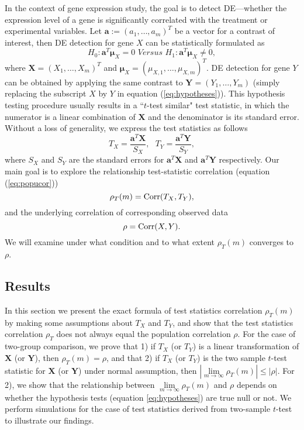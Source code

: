 In the context of gene expression study, the goal is to detect DE---whether the expression 
level of a gene is significantly correlated with the treatment or experimental variables. Let 
$\bm a:=(a_1, \ldots, a_m)^T$ be a vector for a contrast of interest, then DE detection for 
gene $X$ can be statistically formulated as 
\begin{equation}\label{eq:hypotheses}
H_{0}:  \bm a^T\bm \mu_X = 0 \textit{     Versus   }  H_{1}: \bm a^T\bm \mu_X \neq 0,
\end{equation}
where $\bm X = (X_1, \ldots, X_m)^T$ and $\bm \mu_{X} = (\mu_{X, 1}, \ldots, \mu_{X, m})^T$.  
DE detection for gene $Y$ can be obtained by applying the same contrast to $\bm Y = (Y_1, 
\ldots, Y_m)$ (simply replacing the subscript $X$ by $Y$ in equation (\ref{eq:hypotheses})).
This hypothesis testing procedure usually results in a ``$t$-test similar" test statistic, in 
which the numerator is a linear combination of $\bm X$ and the denominator is its standard 
error. Without a loss of generality, we express the test statistics as follows
\begin{equation}\label{eq:teststat}
T_X = \dfrac{\bm a^T\bm X}{S_X},  ~~~ T_Y = \dfrac{\bm a^T \bm Y}{S_Y},
\end{equation}  
where $S_X$ and $S_Y$ are the standard errors for $\bm a^T\bm X$ and $\bm a^T\bm Y$ 
respectively. Our main goal is to explore the relationship test-statistic correlation (equation 
(\ref{eq:popucor}))
\begin{equation}
\rho_T(m)= \text{Corr}({T_X, T_Y}) ,
\end{equation}  
and the underlying correlation of corresponding observed data 
\begin{equation}
\rho = \text{Corr}(X, Y). 
\end{equation}
We will examine under what condition and to what extent $\rho_T(m)$ converges to $\rho$.%



\subsection{Results}\label{section:tcorresults}

In this section we present the exact formula of test statistics correlation $\rho_T(m)$ by 
making some assumptions about $T_X$ and $T_Y$, and show that the test statistics correlation 
$\rho_T$ does not always equal the population correlation $\rho$. For the case of two-group 
comparison, we prove that 1) if $T_X$ (or $T_Y$) is a linear transformation of $\bm X$ (or $\bm 
Y$), then $\rho_T(m)= \rho$, and that 2) if $T_X$ (or $T_Y$) is the 
two sample $t$-test 
statistic 
for $\bm X$ (or $\bm Y$) under normal assumption, then $|\lim\limits_{m\rightarrow\infty}\rho_T(m)| 
\leq |\rho|$. For 2), we show 
that the relationship between 
$\lim\limits_{m\rightarrow\infty}\rho_T(m)$ and $\rho$ depends on whether the hypothesis tests 
(equation \ref{eq:hypotheses}) are 
true null or not. We perform simulations for the case of test statistics derived from 
two-sample $t$-test to illustrate our findings.

